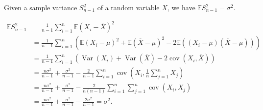 \documentclass{huhtakm-template-book-v2}
\newcommand{\expect}{\mathbb{E}}
\DeclareMathOperator{\Var}{Var}
\DeclareMathOperator{\cov}{cov}
\begin{document}
    \begin{thm}
        Given a sample variance $S_{n-1}^{2}$ of a random variable $X$, we have $\expect{S_{n-1}^{2}} = \sigma^{2}$.
    \end{thm}
    \begin{proofing}
        \begin{align*}
            \expect{S_{n-1}^{2}} &= \frac{1}{n-1}\sum_{i = 1}^{n}\expect(X_{i}-\overline{X})^{2}\\
            &= \frac{1}{n-1}\sum_{i = 1}^{n}\left(\expect(X_{i}-\mu)^{2}+\expect(\overline{X}-\mu)^{2}-2\expect((X_{i}-\mu)(\overline{X}-\mu))\right)\\
            &= \frac{1}{n-1}\sum_{i = 1}^{n}\left(\Var(X_{i})+\Var(\overline{X})-2\cov(X_{i},\overline{X})\right)\\
            &= \frac{n\sigma^{2}}{n-1}+\frac{\sigma^{2}}{n-1}-\frac{2}{n-1}\sum_{i = 1}^{n}\cov\left(X_{i},\frac{1}{n}\sum_{j = 1}^{n}X_{j}\right)\\
            &= \frac{n\sigma^{2}}{n-1}+\frac{\sigma^{2}}{n-1}-\frac{2}{n(n-1)}\sum_{i = 1}^{n}\sum_{j = 1}^{n}\cov(X_{i},X_{j})\\
            &= \frac{n\sigma^{2}}{n-1}+\frac{\sigma^{2}}{n-1}-\frac{2\sigma^{2}}{n-1} = \sigma^{2}.
        \end{align*}
    \end{proofing}
    \newpage
\end{document}
